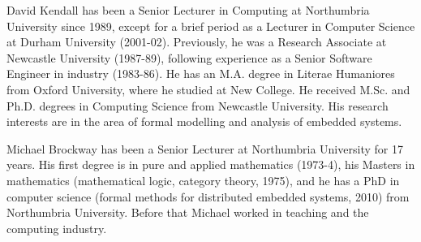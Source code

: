 \documentclass{ieeeaccess}
\begin{document}
\begin{IEEEbiography}{David Kendall}
has been a Senior Lecturer in Computing at Northumbria University since 1989, except for a brief period as a Lecturer in Computer Science at Durham University (2001-02). Previously, he was a Research Associate at Newcastle University (1987-89), following experience as a Senior Software Engineer in industry (1983-86). He has an M.A. degree in Literae Humaniores from Oxford University, where he studied at New College. He received M.Sc. and Ph.D. degrees in Computing Science from Newcastle University. His research interests are in the area of formal modelling and analysis of embedded systems. 
\end{IEEEbiography}

\begin{IEEEbiography}{Michael Brockway}
has been a Senior Lecturer at Northumbria University for 17 years. His first degree is in pure and applied mathematics (1973-4), his Masters in mathematics (mathematical logic, category theory, 1975), and he has a PhD in computer science (formal methods for distributed embedded systems, 2010) from Northumbria University. Before that Michael worked in teaching and the computing industry.
\end{IEEEbiography}

\EOD
\end{document}
